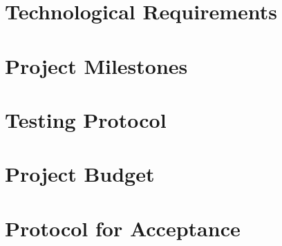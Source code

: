 \documentclass{article}
\begin{document}
\section{Technological Requirements}
\newpage

\section{Project Milestones}
\newpage

\section{Testing Protocol}
\newpage

\section{Project Budget}
\newpage

\section{Protocol for Acceptance}
\newpage



\end{document}
